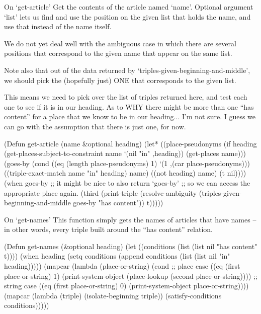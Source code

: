 \begin{notate}{On `get-article'} \label{get-article}
Get the contents of the article named `name'.  Optional
argument `list' lets us find and use the position on the
given list that holds the name, and use that instead of
the name itself.

We do not yet deal well with the ambiguous case in which
there are several positions that correspond to the given
name that appear on the same list.

Note also that out of the data returned by
`triples-given-beginning-and-middle', we should pick the
(hopefully just) ONE that corresponds to the given list.

This means we need to pick over the list of triples
returned here, and test each one to see if it is in our
heading.  As to WHY there might be more than one ``has
content'' for a place that we know to be in our
heading... I'm not sure.  I guess we can go with the
assumption that there is just one, for now.
\end{notate}

\begin{elisp}
(Defun get-article (name &optional heading)
  (let* ((place-pseudonyms
          (if heading
              (get-places-subject-to-constraint
               name `(nil "in" ,heading))
            (get-places name)))
         (goes-by (cond
                    ((eq (length place-pseudonyms) 1)
                     `(1 ,(car place-pseudonyms)))
                    ((triple-exact-match
                      name "in" heading)
                     name)
                    ((not heading) name)
                    (t nil))))
    (when goes-by
      ;; it might be nice to also return `goes-by'
      ;; so we can access the appropriate place again.
      (third (print-triple
              (resolve-ambiguity
               (triples-given-beginning-and-middle
                goes-by "has content"))
              t)))))
\end{elisp}

\begin{notate}{On `get-names'} \label{get-names}
This function simply gets the names of articles that have
names -- in other words, every triple built around the
``has content'' relation.
\end{notate}

\begin{elisp}
(Defun get-names (&optional heading)
  (let ((conditions (list (list nil "has content" t))))
    (when heading
      (setq conditions
            (append conditions
                    (list (list nil "in" heading)))))
    (mapcar
     (lambda (place-or-string)
       (cond
         ;; place case
         ((eq (first place-or-string) 1)
          (print-system-object
           (place-lookup (second place-or-string))))
         ;; string case
         ((eq (first place-or-string) 0)
          (print-system-object place-or-string))))
     (mapcar
      (lambda (triple)
        (isolate-beginning triple))
      (satisfy-conditions conditions)))))
\end{elisp}

